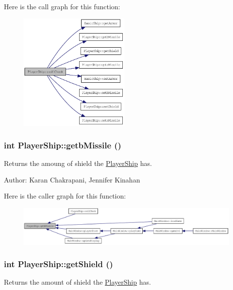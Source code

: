 Here is the call graph for this function:\nopagebreak
\begin{figure}[H]
\begin{center}
\leavevmode
\includegraphics[width=156pt]{class_player_ship_a9c3745489576a8c3027b9e17ac2046fb_cgraph}
\end{center}
\end{figure}
\hypertarget{class_player_ship_ac6e2929a3b840cd1fea30795b49d5063}{
\subsubsection[{getbMissile}]{\setlength{\rightskip}{0pt plus 5cm}int PlayerShip::getbMissile ()}}
\label{class_player_ship_ac6e2929a3b840cd1fea30795b49d5063}
Returns the amoung of shield the \hyperlink{class_player_ship}{PlayerShip} has.

Author: Karan Chakrapani, Jennifer Kinahan 

Here is the caller graph for this function:\nopagebreak
\begin{figure}[H]
\begin{center}
\leavevmode
\includegraphics[width=413pt]{class_player_ship_ac6e2929a3b840cd1fea30795b49d5063_icgraph}
\end{center}
\end{figure}
\hypertarget{class_player_ship_a84fda0bb0ef416d7bcf04f4e3a89c181}{
\subsubsection[{getShield}]{\setlength{\rightskip}{0pt plus 5cm}int PlayerShip::getShield ()}}
\label{class_player_ship_a84fda0bb0ef416d7bcf04f4e3a89c181}
Returns the amount of shield the \hyperlink{class_player_ship}{PlayerShip} has.

